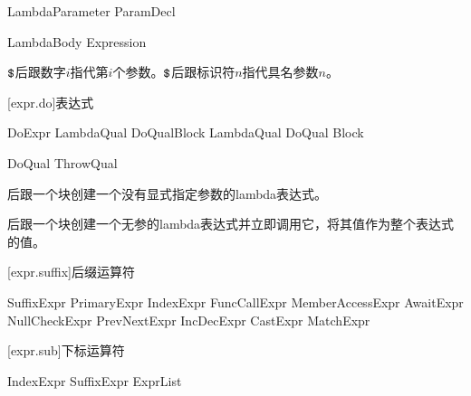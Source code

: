 \begin{bnf}{LambdaParameter}
    ParamDecl
\end{bnf}

\begin{bnf}{LambdaBody}
    Expression
\end{bnf}

\pnum
$\texttt{\$}$后跟数字$i$指代第$i$个参数。$\texttt{\$}$后跟标识符$n$指代具名参数$n$。

[expr.do]{表达式}

\begin{bnf}{DoExpr}
    LambdaQual\bnfs {} DoQual\bnfs Block \br
    LambdaQual\bnfs {} DoQual\bnfs \terminal{!} Block
\end{bnf}

\begin{bnf}{DoQual}
    ThrowQual
\end{bnf}

\pnum
{}后跟一个块创建一个没有显式指定参数的lambda表达式。

\pnum
{}后跟一个块创建一个无参的lambda表达式并立即调用它，将其值作为整个表达式的值。

\enterexample
{}
\exitexample

[expr.suffix]{后缀运算符}

\begin{bnf}{SuffixExpr}
    PrimaryExpr \br
    IndexExpr \br
    FuncCallExpr \br
    MemberAccessExpr \br
    AwaitExpr \br
    NullCheckExpr \br
    PrevNextExpr \br
    IncDecExpr \br
    CastExpr \br
    MatchExpr
\end{bnf}

[expr.sub]{下标运算符}

\begin{bnf}{IndexExpr}
    SuffixExpr \terminal{[} ExprList\bnfq \terminal{]}
\end{bnf}

